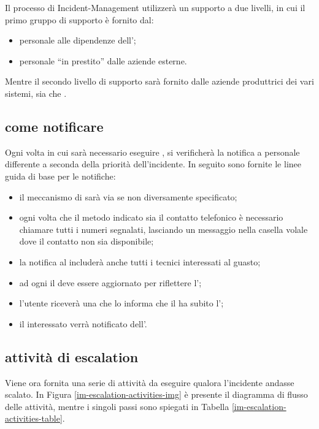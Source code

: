 Il processo di \ac{Incident-Management} utilizzerà un supporto a due livelli, in cui il primo gruppo di supporto è fornito dal:

\begin{itemize}
\item{personale alle dipendenze dell'\entity{};}
\item{personale ``in prestito'' dalle aziende esterne.}
\end{itemize}

Mentre il secondo livello di supporto sarà fornito dalle aziende produttrici dei vari sistemi, sia  che .

\clearpage{}
\subsection[Come notificare]{come notificare}
\label{im-escalation-how-to}
Ogni volta in cui sarà necessario eseguire , si verificherà la notifica a personale differente a seconda della priorità dell'incidente. In seguito sono fornite le linee guida di base per le notifiche:

\begin{itemize}
\item{il meccanismo di  sarà via  se non diversamente specificato;}
\item{ogni volta che il metodo indicato sia il contatto telefonico è necessario chiamare tutti i numeri segnalati, lasciando un messaggio nella casella volale dove il contatto non sia disponibile;}
\item{la notifica al  includerà anche tutti i tecnici interessati al guasto;}
\item{ad ogni  il  deve essere aggiornato per riflettere l';}
\item{l'utente riceverà una  che lo informa che il  ha subito l';}
\item{il  interessato verrà notificato dell'.}
\end{itemize}

\subsection[Attività di escalation]{attività di escalation}
\label{im-escalation-activities}
Viene ora fornita una serie di attività da eseguire qualora l'incidente andasse scalato. In Figura \ref{im-escalation-activities-img} è presente il diagramma di flusso delle attività, mentre i singoli passi sono spiegati in Tabella \ref{im-escalation-activities-table}.

